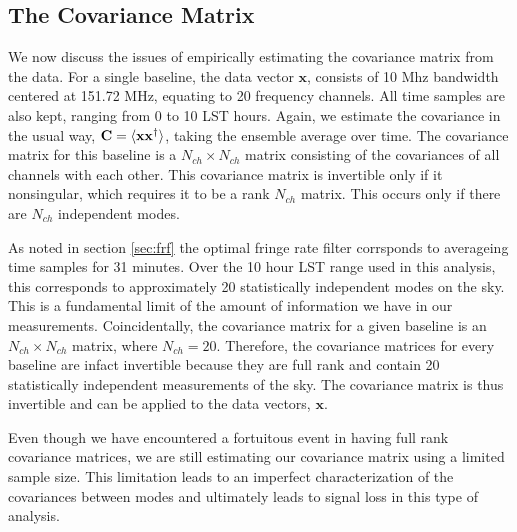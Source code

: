 \documentclass[twocolumn,numberedappendix]{emulateapj} \shorttitle{PSA64}
\newcommand{\x}{\mathbf{x}} \newcommand{\xhat}{\hat{\mathbf{x}}}
\newcommand{\C}{\mathbf{C}} \newcommand{\Q}{\mathbf{Q}}
\begin{document}
\subsection{The Covariance Matrix}
%

We now discuss the issues of empirically estimating the covariance matrix from
the data. For a single baseline, the data vector $\x$, consists of 10 Mhz
bandwidth centered at 151.72 MHz, equating to 20 frequency channels.
All time samples are also kept, ranging from 0 to 10 LST hours. Again, we
estimate the covariance in the usual way, $\C = \expval{\x\x^{\dagger}}$, taking
the ensemble average over time. The covariance matrix for this baseline is a
$N_{ch}\times N_{ch}$ matrix consisting of the covariances of all channels with
each other. This covariance matrix is invertible only if it nonsingular, which
requires it to be a rank $N_{ch}$ matrix. This occurs only if there are $N_{ch}$
independent modes. 

As noted in section \ref{sec:frf} the optimal fringe rate filter corrsponds to
averageing time samples for 31 minutes. Over the 10 hour LST range used in this
analysis, this corresponds to approximately 20 statistically independent modes
on the sky. This is a fundamental limit of the amount of information we have in
our measurements. Coincidentally, the covariance matrix for a given baseline is
an $N_{ch} \times N_{ch}$ matrix, where $N_{ch}=20$.  Therefore, the covariance
matrices for every baseline are infact invertible because they are full rank 
and contain 20 statistically independent measurements of the sky. The covariance
matrix is thus invertible and can be applied to the data vectors, $\x$. 

%
Even though we have encountered a fortuitous event in having full rank
covariance matrices, we are still estimating our covariance matrix using a
limited sample size. This limitation leads to an imperfect characterization of
the covariances between modes and ultimately leads to signal loss in this type
of analysis. 
\end{document}
